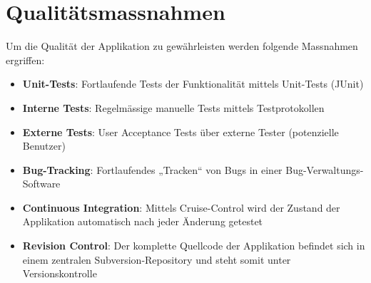 \documentclass[a4paper,12pt,halfparskip,DIV14]{scrreprt}
\begin{document}
\section{Qualitätsmassnahmen}

Um die Qualität der Applikation zu gewährleisten werden folgende Massnahmen ergriffen:
\begin{itemize}
	\item \textbf{Unit-Tests}: Fortlaufende Tests der Funktionalität mittels Unit-Tests (JUnit)
	\item \textbf{Interne Tests}: Regelmässige manuelle Tests mittels Testprotokollen
	\item \textbf{Externe Tests}: User Acceptance Tests über externe Tester (potenzielle Benutzer)
	\item \textbf{Bug-Tracking}: Fortlaufendes „Tracken“ von Bugs in einer Bug-Verwaltungs-Software
	\item \textbf{Continuous Integration}: Mittels Cruise-Control wird der Zustand der Applikation automatisch nach jeder Änderung getestet
	\item \textbf{Revision Control}: Der komplette Quellcode der Applikation befindet sich in einem zentralen Subversion-Repository und steht somit unter Versionskontrolle
\end{itemize}
\end{document}
